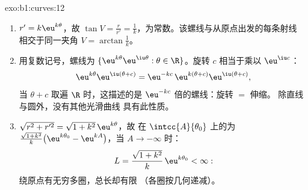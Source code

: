 \begin{solution}{exo:b1:curves:12}
\begin{enumerate}
  \item $r' = k\eu^{k\theta}$，故 $\tan V = \frac{r}{r'} =
        \frac1k$，为常数。该螺线与从原点出发的每条射线
        相交于同一夹角 $V = \arctan\frac1k$。
  \item 用复数记号，螺线为 $\{\eu^{k\theta}
        \eu^{\iu\theta} : \theta \in \R\}$。旋转 $c$
        相当于乘以 $\eu^{\iu c}$：
        \[
        \eu^{k\theta}\eu^{\iu(\theta + c)}
        = \eu^{-kc}\,\eu^{k(\theta + c)}\eu^{\iu(\theta+c)} ,
        \]
        当 $\theta + c$ 取遍 $\R$ 时，这描述的是
        $\eu^{-kc}$ 倍的螺线：旋转 $=$ 伸缩。
        除直线与圆外，没有其他光滑曲线
        具有此性质。
  \item $\sqrt{r^2 + r'^2} = \sqrt{1 + k^2}\,\eu^{k\theta}$，故
        在 $\intcc{A}{\theta_0}$ 上的为
        $\frac{\sqrt{1+k^2}}{k}\bigl(\eu^{k\theta_0} -
        \eu^{kA}\bigr)$，当 $A \to -\infty$ 时：
        \[
        L = \frac{\sqrt{1 + k^2}}{k}\,\eu^{k\theta_0} < \infty :
        \]
        绕原点有无穷多圈，总长却有限
        （各圈按几何递减）。
\end{enumerate}
\end{solution}

